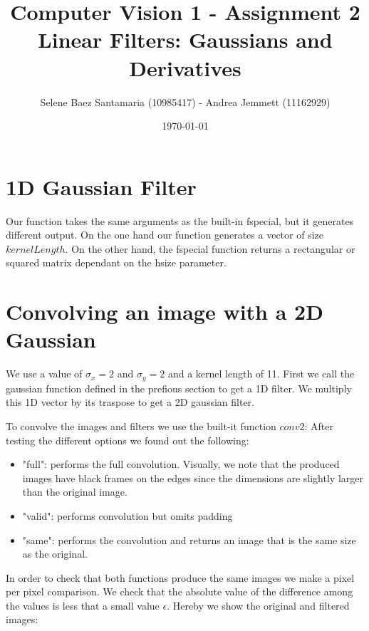 \documentclass[11pt]{article}
\title{
	{Computer Vision 1 - Assignment 2 \\
	Linear Filters: Gaussians and Derivatives}
}
\author{
Selene Baez Santamaria (10985417) - Andrea Jemmett (11162929)}
\date{\today}
\begin{document}
\maketitle


\section{1D Gaussian Filter}
Our function takes the same arguments as the built-in fspecial, but it generates different output. On the one hand our function generates a vector of size $kernelLength$. On the other hand, the fspecial function returns a rectangular or squared matrix dependant on the hsize parameter. 


\section{Convolving an image with a 2D Gaussian}
We use a value of $\sigma_x = 2$ and $\sigma_y = 2$ and a kernel length of 11. First we call the gaussian function defined in the prefious section to get a 1D filter. We multiply this 1D vector by its traspose to get a 2D gaussian filter. 

To convolve the images and filters we use the built-it function $conv2$: After testing the different options we found out the following:

\begin{itemize}
	\item "full": performs the full convolution. Visually, we note that the produced images have black frames on the edges since the dimensions are slightly larger than the original image.
	\item "valid": performs convolution but omits padding %
	\item "same": performs the convolution and returns an image that is the same size as the original. 
\end{itemize}

In order to check that both functions produce the same images we make a pixel per pixel comparison. We check that the absolute value of the difference among the values is less that a small value $\epsilon$. Hereby we show the original and filtered images:
\end{document}
